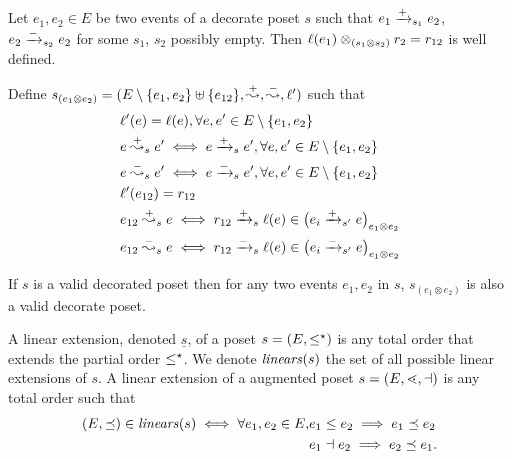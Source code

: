 \begin{definition}
  Let $e_1,e_2\in E$ be two events of a decorate poset $s$ such that $e_1\mathrel{\xrightarrow{+}}_{s_1}e_2$, $e_2\mathrel{\xrightarrow{-}}_{s_2}e_2$ for some $s_1$, $s_2$ possibly empty. Then $\ell(e_1)\otimes_{(s_1\otimes s_2)} r_2=r_{12}$ is well defined.

  Define $s_{(e_1\otimes e_2)} = (E\setminus\{e_1,e_2\}\uplus\{e_{12}\},\overset{+}{\leadsto},\overset{-}{\leadsto},\ell')$ such that
    \begin{align*}
    &\ell'(e)=\ell(e), \forall e,e'\in E\setminus\{e_1,e_2\}\\
    &e\overset{+}{\leadsto}_s e' \iff e\mathrel{\xrightarrow{+}}_s e', \forall e,e'\in E\setminus\{e_1,e_2\}\\
    &e\overset{-}{\leadsto}_s e' \iff e\mathrel{\xrightarrow{-}}_s e', \forall e,e'\in E\setminus\{e_1,e_2\}\\
    &\ell'(e_{12}) = r_{12}\\
    &e_{12}\overset{+}{\leadsto}_s e \iff r_{12}\mathrel{\xrightarrow{+}}_s \ell(e)\in \big(e_i \mathrel{\xrightarrow{+}}_{s'} e\big)_{e_1\otimes e_2}\\
    &e_{12}\overset{-}{\leadsto}_s e \iff r_{12}\mathrel{\xrightarrow{-}}_s \ell(e)\in \big(e_i \mathrel{\xrightarrow{-}}_{s'} e\big)_{e_1\otimes e_2}\\
  \end{align*}
\end{definition}

\begin{lemma}
  If $s$ is a valid decorated poset then for any two events $e_1,e_2$ in $s$, $s_{(e_1\otimes e_2)}$ is also a valid decorate poset.
\end{lemma}

\begin{definition}
  A linear extension, denoted $\underline{s}$, of a poset $s=(E,\leq^{\star})$ is any total order that extends the partial order $\leq^{\star}$. We denote $\mathit{linears}(s)$ the set of all possible linear extensions of $s$.
  A linear extension of a augmented poset $s=(E,\lessdot,\dashv)$ is any total order such that
  \begin{align*}
    (E,\preceq)\in\mathit{linears}(s) \iff \forall e_1,e_2\in E, &e_1\leq e_2\implies e_1\preceq e_2\\
    & e_1\dashv e_2\implies e_2\preceq e_1.
  \end{align*}
\end{definition}

